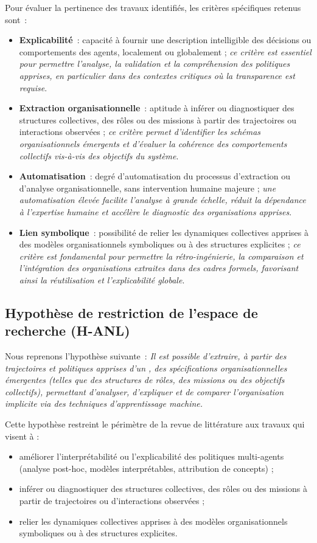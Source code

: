 Pour évaluer la pertinence des travaux identifiés, les critères spécifiques retenus sont~:
\begin{itemize}
    \item \textbf{Explicabilité}~: capacité à fournir une description intelligible des décisions ou comportements des agents, localement ou globalement ; \emph{ce critère est essentiel pour permettre l’analyse, la validation et la compréhension des politiques apprises, en particulier dans des contextes critiques où la transparence est requise}.
    \item \textbf{Extraction organisationnelle}~: aptitude à inférer ou diagnostiquer des structures collectives, des rôles ou des missions à partir des trajectoires ou interactions observées ; \emph{ce critère permet d’identifier les schémas organisationnels émergents et d’évaluer la cohérence des comportements collectifs vis-à-vis des objectifs du système}.
    \item \textbf{Automatisation}~: degré d'automatisation du processus d'extraction ou d'analyse organisationnelle, sans intervention humaine majeure ; \emph{une automatisation élevée facilite l’analyse à grande échelle, réduit la dépendance à l’expertise humaine et accélère le diagnostic des organisations apprises}.
    \item \textbf{Lien symbolique}~: possibilité de relier les dynamiques collectives apprises à des modèles organisationnels symboliques ou à des structures explicites ; \emph{ce critère est fondamental pour permettre la rétro-ingénierie, la comparaison et l’intégration des organisations extraites dans des cadres formels, favorisant ainsi la réutilisation et l’explicabilité globale}.
\end{itemize}

\subsection*{Hypothèse de restriction de l’espace de recherche (\textbf{H-ANL})}

Nous reprenons l’hypothèse suivante~: \textit{Il est possible d’extraire, à partir des trajectoires et politiques apprises d’un , des spécifications organisationnelles émergentes (telles que des structures de rôles, des missions ou des objectifs collectifs), permettant d’analyser, d’expliquer et de comparer l’organisation implicite via des techniques d'apprentissage machine.}

Cette hypothèse restreint le périmètre de la revue de littérature aux travaux qui visent à :
\begin{itemize}
    \item améliorer l’interprétabilité ou l’explicabilité des politiques multi-agents (analyse post-hoc, modèles interprétables, attribution de concepts) ;
    \item inférer ou diagnostiquer des structures collectives, des rôles ou des missions à partir de trajectoires ou d’interactions observées ;
    \item relier les dynamiques collectives apprises à des modèles organisationnels symboliques ou à des structures explicites.
\end{itemize}

